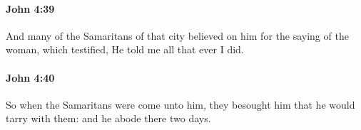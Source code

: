 		\paragraph{John 4:39} %
			\label{JOHN-4-39}

			And many of the Samaritans of that city believed on him for the saying of the woman, which testified, He told me all that ever I did.

			\begin{framed}
			\scriptsize
				\begin{compactdesc}
					\item[SBLG] 
				\end{compactdesc}
			\end{framed}

		\paragraph{John 4:40} %
			\label{JOHN-4-40}

			So when the Samaritans were come unto him, they besought him that he would tarry with them: and he abode there two days.

